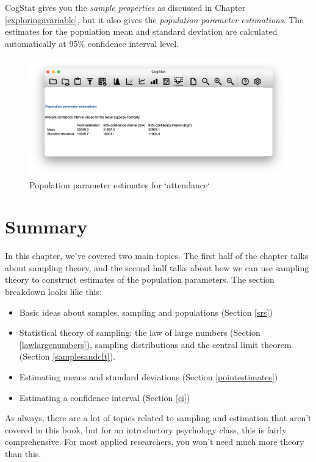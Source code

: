 \documentclass[
  11pt,
  a4paper,
  twoside,symmetric,openright]{book}
\providecommand{\tightlist}{%
  \setlength{\itemsep}{0pt}\setlength{\parskip}{0pt}}
\theoremstyle{break}
\theoremstyle{break}
\begin{document}
CogStat gives you the \emph{sample properties} as discussed in Chapter \ref{exploringavariable}, but it also gives the \emph{population parameter estimations}. The estimates for the population mean and standard deviation are calculated automatically at 95\% confidence interval level.

\begin{figure}

{\centering \includegraphics[width=0.6\linewidth]{resources/image/cogstatattendancepopulation} 

}

\caption{Population parameter estimates for `attendance`}\label{fig:unnamed-chunk-31}
\end{figure}

\section{Summary}\label{summary-4}

In this chapter, we've covered two main topics. The first half of the chapter talks about sampling theory, and the second half talks about how we can use sampling theory to construct estimates of the population parameters. The section breakdown looks like this:

\begin{itemize}
\tightlist
\item
  Basic ideas about samples, sampling and populations (Section \ref{srs})
\item
  Statistical theory of sampling: the law of large numbers (Section \ref{lawlargenumbers}), sampling distributions and the central limit theorem (Section \ref{samplesandclt}).
\item
  Estimating means and standard deviations (Section \ref{pointestimates})
\item
  Estimating a confidence interval (Section \ref{ci})
\end{itemize}

As always, there are a lot of topics related to sampling and estimation that aren't covered in this book, but for an introductory psychology class, this is fairly comprehensive. For most applied researchers, you won't need much more theory than this.
\end{document}

